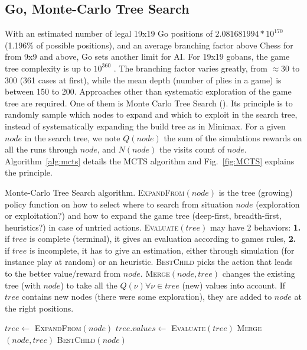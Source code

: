 \subsection{Go, Monte-Carlo Tree Search}
With an estimated number of legal 19x19 Go positions of $2.081681994 * 10^{170}$ \citep{tromp2006} (1.196\% of possible positions), and an average branching factor above Chess for  from 9x9 and above, Go sets another limit for AI. For 19x19 gobans, the game tree complexity is up to $10^{360}$ \citep{allis1994}. The branching factor varies greatly, from $\approx 30$ to $300$ (361 cases at first), while the mean depth (number of plies in a game) is between 150 to 200. Approaches other than systematic exploration of the game tree are required. One of them is Monte Carlo Tree Search (). Its principle is to randomly sample which nodes to expand and which to exploit in the search tree, instead of systematically expanding the build tree as in Minimax. For a given $node$ in the search tree, we note $Q(node)$ the sum of the simulations rewards on all the runs through $node$, and $N(node)$ the visits count of $node$. Algorithm~\ref{alg:mcts} details the MCTS algorithm and Fig.~\ref{fig:MCTS} explains the principle.

\begin{algorithm}
\caption{Monte-Carlo Tree Search algorithm. 
\textsc{ExpandFrom}$(node)$ is the tree (growing) policy function on how to select where to search from situation $node$ (exploration or exploitation?) and how to expand the game tree (deep-first, breadth-first, heuristics?) in case of untried actions. \textsc{Evaluate}$(tree)$ may have 2 behaviors: \textbf{1.} if $tree$ is complete (terminal), it gives an evaluation according to games rules, \textbf{2.} if $tree$ is incomplete, it has to give an estimation, either through simulation (for instance play at random) or an heuristic. \textsc{BestChild} picks the action that leads to the better value/reward from $node$. \textsc{Merge}$(node, tree)$ changes the existing tree (with $node$) to take all the $Q(\nu) \forall \nu \in tree$ (new) values into account. If $tree$ contains new nodes (there were some exploration), they are added to $node$ at the right positions.}
\label{alg:mcts}
\begin{algorithmic}
        \State $tree \gets$ \textsc{ExpandFrom}$(node)$
        \State $tree.values \gets$ \textsc{Evaluate}$(tree)$
        \State \textsc{Merge}$(node, tree)$
    \EndWhile
    \State \Return \textsc{BestChild}$(node)$
\EndFunction
\end{algorithmic}
\end{algorithm}


